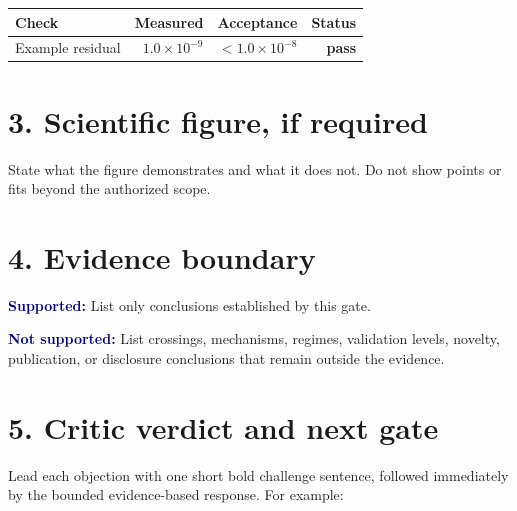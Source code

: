 \documentclass[11pt]{article}
\newcommand{\supported}[1]{\textcolor{navy}{\textbf{Supported:}} #1}
\newcommand{\notsupported}[1]{\textcolor{navy}{\textbf{Not supported:}} #1}
\newcommand{\statuspass}{\textcolor{passgreen}{\textbf{pass}}}
\begin{document}
\begin{center}
\begin{tabular}{lrrr}
\toprule
Check & Measured & Acceptance & Status\\
\midrule
Example residual & $1.0\times10^{-9}$ & $<1.0\times10^{-8}$ & \statuspass\\
\bottomrule
\end{tabular}
\end{center}

\clearpage
\section*{3. Scientific figure, if required}
\thispagestyle{fancy}


State what the figure demonstrates and what it does not. Do not show points or
fits beyond the authorized scope.

\section*{4. Evidence boundary}


\supported{List only conclusions established by this gate.}

\notsupported{List crossings, mechanisms, regimes, validation levels, novelty,
publication, or disclosure conclusions that remain outside the evidence.}

\clearpage
\section*{5. Critic verdict and next gate}
\thispagestyle{fancy}

Lead each objection with one short bold challenge sentence, followed
immediately by the bounded evidence-based response. For example:
\end{document}
